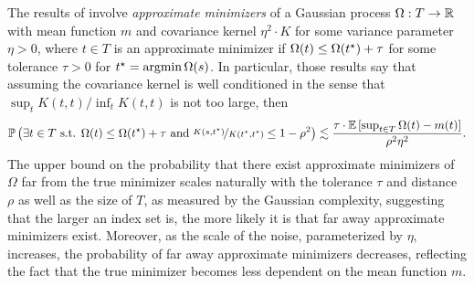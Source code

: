 The results of \citet{block2022smoothed,block2024oracle} involve \emph{approximate minimizers} of a Gaussian process $\Omega: T \to \mathbb{R}$ with mean function $m$ and covariance kernel $\eta^2 \cdot K$ for some variance parameter $\eta > 0$, where $t \in T$ is an approximate minimizer if $\Omega(t) \leq \Omega(t^\star) + \tau$ for some tolerance $\tau > 0$ for $t^\star = \operatorname*{argmin} \Omega(s)$.  In particular, those results say that assuming the covariance kernel is well conditioned in the sense that $\sup_t K(t,t) / \inf_t K(t,t)$ is not too large, then
\begin{align}\label{eq:gp_stability_old}
    \mathbb{P}\left( \exists t \in T \text{ s.t. } \Omega(t) \leq \Omega(t^\star) + \tau \text{ and } \nicefrac{K(s,t^\star)}{K(t^\star, t^\star)} \leq 1 - \rho^2 \right) 
    \lesssim \frac{\tau \cdot \mathbb{E}\left[ \sup_{t \in T} \Omega(t) - m(t) \right]}{\rho^2 \eta^2}.
\end{align}
The upper bound on the probability that there exist approximate minimizers of $\Omega$ far from the true minimizer scales naturally with the tolerance $\tau$ and distance $\rho$ as well as the size of $T$, as measured by the Gaussian complexity, suggesting that the larger an index set is, the more likely it is that far away approximate minimizers exist.  Moreover, as the scale of the noise, parameterized by $\eta$, increases, the probability of far away approximate minimizers decreases, reflecting the fact that the true minimizer becomes less dependent on the mean function $m$.

